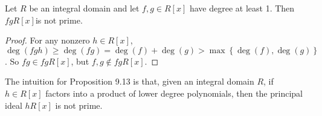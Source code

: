 \documentclass[pmath347]{subfiles}
\begin{document}
    \begin{prop}{}
        Let $R$ be an integral domain and let $f,g\in R\left[ x \right]$ have degree at least 1. Then $fgR\left[ x \right]$is not prime. 
    \end{prop}

    \begin{proof}
        For any nonzero $h\in R\left[ x \right]$, $\deg\left( fgh \right) \geq \deg\left( fg \right) = \deg\left( f \right) + \deg\left( g \right) > \max\left\lbrace \deg\left( f \right) ,\deg\left( g \right)  \right\rbrace$. So $fg\in fgR\left[ x \right]$, but $f,g\notin fgR\left[ x \right]$.
    \end{proof}

    \np The intuition for Proposition 9.13 is that, given an integral domain $R$, if $h\in R\left[ x \right]$ factors into a product of lower degree polynomials, then the principal ideal $hR\left[ x \right]$ is not prime.
\end{document}
